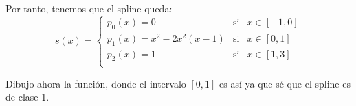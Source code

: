 \begin{ejercicio}
    Por tanto, tenemos que el spline queda:
    \begin{equation*}
        s(x)=\left\{\begin{array}{lll}
            p_0(x)=0 & \text{si} & x\in [-1, 0] \\
            p_1(x)=x^2-2x^2(x-1) & \text{si} & x\in [0,1] \\
            p_2(x)=1 & \text{si} & x\in [1,3] \\
        \end{array} \right.
    \end{equation*}

    Dibujo ahora la función, donde el intervalo $[0,1]$ es así ya que sé que el spline es de clase 1.

    \begin{figure}[H]
        \centering
    \end{figure}
\end{ejercicio}

